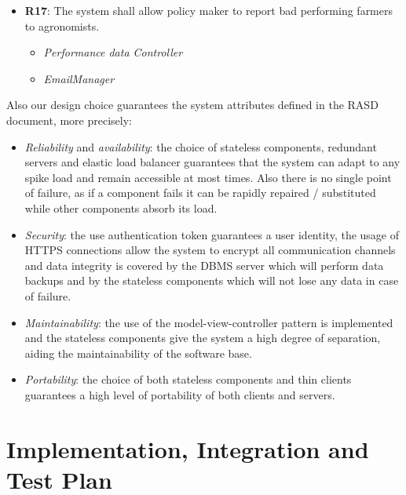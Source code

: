 \documentclass{article}
\begin{document}
\begin{itemize}
        \item \textbf{R17}: The system shall allow policy maker to report bad performing farmers to agronomists.
            \begin{itemize}
                \item \textit{Performance data Controller}
                \item \textit{EmailManager}
            \end{itemize}
        
    \end{itemize}

    Also our design choice guarantees the system attributes defined in the RASD document, more precisely:
    
    \begin{itemize}
        
        \item \textit{Reliability} and \textit{availability}: the choice of stateless components, redundant servers and elastic load balancer guarantees that the system can adapt to any spike load and remain accessible at most times. Also there is no single point of failure, as if a component fails it can be rapidly repaired / substituted while other components absorb its load.
        
        \item \textit{Security}: the use authentication token guarantees a user identity, the usage of HTTPS connections allow the system to encrypt all communication channels and data integrity is covered by the DBMS server which will perform data backups and by the stateless components which will not lose any data in case of failure.
        
        \item \textit{Maintainability}: the use of the model-view-controller pattern is implemented and the stateless components give the system a high degree of separation, aiding the maintainability of the software base.
        
        \item \textit{Portability}: the choice of both stateless components and thin clients guarantees a high level of portability of both clients and servers.
        
    \end{itemize}


\newpage





\section{Implementation, Integration and Test Plan}
\end{document}

